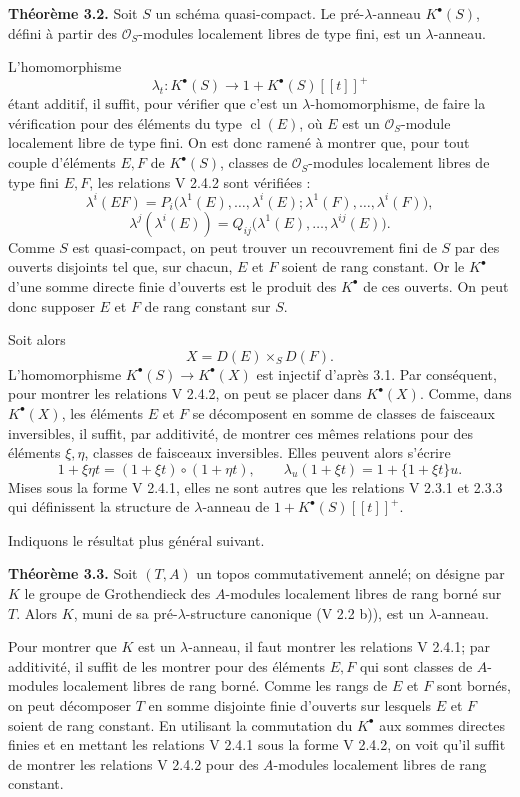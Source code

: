 \documentclass[11pt]{article}
\begin{document}
\textbf{Théorème 3.2.} Soit \(S\) un schéma quasi-compact. Le pré-\(\lambda\)-anneau \(K^\bullet(S)\), défini à partir des \(\mathcal O_S\)-modules localement libres de type fini, est un \(\lambda\)-anneau.

L'homomorphisme
\[
  \lambda_t:K^\bullet(S)\longrightarrow 1+K^\bullet(S)[[t]]^+
\]
étant additif, il suffit, pour vérifier que c'est un \(\lambda\)-homomorphisme, de faire la vérification pour des éléments du type \(\operatorname{cl}(E)\), où \(E\) est un \(\mathcal O_S\)-module localement libre de type fini. On est donc ramené à montrer que, pour tout couple d'éléments \(E,F\) de \(K^\bullet(S)\), classes de \(\mathcal O_S\)-modules localement libres de type fini \(E,F\), les relations V 2.4.2 sont vérifiées :
\[
 \lambda^i(EF)
 =
 P_i\bigl(\lambda^1(E),\ldots,\lambda^i(E);
          \lambda^1(F),\ldots,\lambda^i(F)\bigr),
\]
\[
 \lambda^j(\lambda^i(E))
 =
 Q_{ij}\bigl(\lambda^1(E),\ldots,\lambda^{ij}(E)\bigr).
\]
Comme \(S\) est quasi-compact, on peut trouver un recouvrement fini de \(S\) par des ouverts disjoints tel que, sur chacun, \(E\) et \(F\) soient de rang constant. Or le \(K^\bullet\) d'une somme directe finie d'ouverts est le produit des \(K^\bullet\) de ces ouverts. On peut donc supposer \(E\) et \(F\) de rang constant sur \(S\).

Soit alors
\[
  X=D(E)\times_S D(F).
\]
L'homomorphisme \(K^\bullet(S)\to K^\bullet(X)\) est injectif d'après 3.1. Par conséquent, pour montrer les relations V 2.4.2, on peut se placer dans \(K^\bullet(X)\). Comme, dans \(K^\bullet(X)\), les éléments \(E\) et \(F\) se décomposent en somme de classes de faisceaux inversibles, il suffit, par additivité, de montrer ces mêmes relations pour des éléments \(\xi,\eta\), classes de faisceaux inversibles. Elles peuvent alors s'écrire
\[
  1+\xi\eta t=(1+\xi t)\circ(1+\eta t),
  \qquad
  \lambda_u(1+\xi t)=1+\{1+\xi t\}u.
\]
Mises sous la forme V 2.4.1, elles ne sont autres que les relations V 2.3.1 et 2.3.3 qui définissent la structure de \(\lambda\)-anneau de \(1+K^\bullet(S)[[t]]^+\).

Indiquons le résultat plus général suivant.

\textbf{Théorème 3.3.} Soit \((T,A)\) un topos commutativement annelé; on désigne par \(K\) le groupe de Grothendieck des \(A\)-modules localement libres de rang borné sur \(T\). Alors \(K\), muni de sa pré-\(\lambda\)-structure canonique (V 2.2 b)), est un \(\lambda\)-anneau.

Pour montrer que \(K\) est un \(\lambda\)-anneau, il faut montrer les relations V 2.4.1; par additivité, il suffit de les montrer pour des éléments \(E,F\) qui sont classes de \(A\)-modules localement libres de rang borné. Comme les rangs de \(E\) et \(F\) sont bornés, on peut décomposer \(T\) en somme disjointe finie d'ouverts sur lesquels \(E\) et \(F\) soient de rang constant. En utilisant la commutation du \(K^\bullet\) aux sommes directes finies et en mettant les relations V 2.4.1 sous la forme V 2.4.2, on voit qu'il suffit de montrer les relations V 2.4.2 pour des \(A\)-modules localement libres de rang constant.
\end{document}
